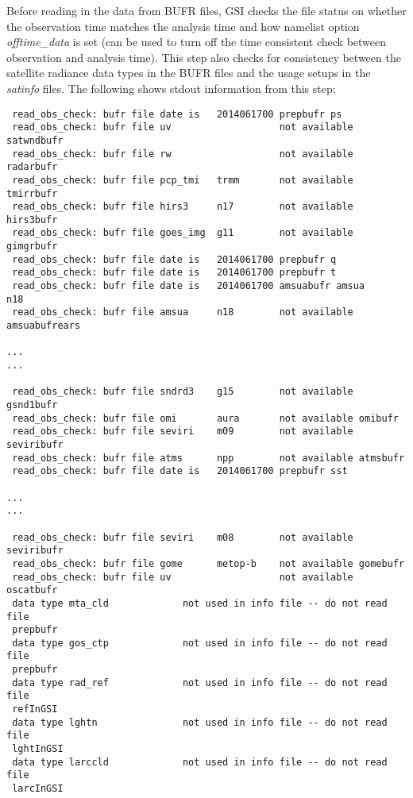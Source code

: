 Before reading in the data from BUFR files, GSI checks the file status on whether the observation time matches the analysis time and how namelist option \textit{offtime\_data} is set (can be used to turn off the time consistent check between observation and analysis time). This step also checks for consistency between the satellite radiance data types in the BUFR files and the usage setups in the \textit{satinfo} files. The following shows stdout information from this step:

\begin{scriptsize}
\begin{verbatim}
 read_obs_check: bufr file date is   2014061700 prepbufr ps
 read_obs_check: bufr file uv                   not available satwndbufr
 read_obs_check: bufr file rw                   not available radarbufr
 read_obs_check: bufr file pcp_tmi   trmm       not available tmirrbufr
 read_obs_check: bufr file hirs3     n17        not available hirs3bufr
 read_obs_check: bufr file goes_img  g11        not available gimgrbufr
 read_obs_check: bufr file date is   2014061700 prepbufr q
 read_obs_check: bufr file date is   2014061700 prepbufr t
 read_obs_check: bufr file date is   2014061700 amsuabufr amsua     n18
 read_obs_check: bufr file amsua     n18        not available amsuabufrears

...
...
 
 read_obs_check: bufr file sndrd3    g15        not available gsnd1bufr
 read_obs_check: bufr file omi       aura       not available omibufr
 read_obs_check: bufr file seviri    m09        not available seviribufr
 read_obs_check: bufr file atms      npp        not available atmsbufr
 read_obs_check: bufr file date is   2014061700 prepbufr sst

...
...

 read_obs_check: bufr file seviri    m08        not available seviribufr
 read_obs_check: bufr file gome      metop-b    not available gomebufr
 read_obs_check: bufr file uv                   not available oscatbufr
 data type mta_cld             not used in info file -- do not read file
 prepbufr
 data type gos_ctp             not used in info file -- do not read file
 prepbufr
 data type rad_ref             not used in info file -- do not read file
 refInGSI
 data type lghtn               not used in info file -- do not read file
 lghtInGSI
 data type larccld             not used in info file -- do not read file
 larcInGSI
\end{verbatim}
\end{scriptsize}

